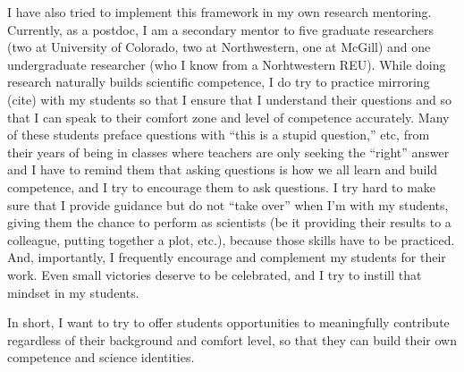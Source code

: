 \documentclass[11pt]{article}
\begin{document}
I have also tried to implement this framework in my own research mentoring. 
Currently, as a postdoc, I am a secondary mentor to five graduate researchers (two at University of Colorado, two at Northwestern, one at McGill) and one undergraduate researcher (who I know from a Norhtwestern REU). 
While doing research naturally builds scientific competence, I do try to practice mirroring (cite) with my students so that I ensure that I understand their questions and so that I can speak to their comfort zone and level of competence accurately. 
Many of these students preface questions with “this is a stupid question,” etc, from their years of being in classes where teachers are only seeking the “right” answer and I have to remind them that asking questions is how we all learn and build competence, and I try to encourage them to ask questions. 
I try hard to make sure that I provide guidance but do not “take over” when I’m with my students, giving them the chance to perform as scientists (be it providing their results to a colleague, putting together a plot, etc.), because those skills have to be practiced. 
And, importantly, I frequently encourage and complement my students for their work. 
Even small victories deserve to be celebrated, and I try to instill that mindset in my students.

In short, I want to try to offer students opportunities to meaningfully contribute regardless of their background and comfort level, so that they can build their own competence and science identities.


{\scriptsize

}
\end{document}
